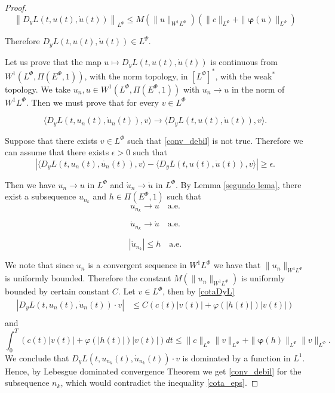 \documentclass[twoside]{article}
\newcommand{\orlnor}{\|_{L^{\Phi}}}
\newcommand{\lphi}{L^{\Phi}}
\newcommand{\lpsi}{L^{\Psi}}
\newcommand{\ephi}{E^{\Phi}}
\newcommand{\wphi}{W^{1}\lphi}
\begin{document}
\begin{proof}
\begin{equation}\label{DyLpsi}
   \left\|D_yL(t,u(t),\dot{u}(t))\right\|_{L^{\Psi}}\leq  M(\|u\|_{\wphi} )\left(\|c\|_{L^{\Psi}}+\|\boldsymbol{\varphi}(u)\|_{L^{\Psi}} \right)
\end{equation}

Therefore $D_yL(t,u(t),\dot{u}(t))\in L^{\Psi}$.

Let us prove that the map   $u\mapsto D_yL(t,u(t),\dot{u}(t))$ is continuous from $W^{1}(\lphi,\Pi(\ephi,1))$, with the norm topology, in $\left[\lphi\right]^{*}$,
with the weak$^*$ topology. We take $u_n,u\in W^{1}(\lphi,\Pi(\ephi,1))$ with $u_n\to u$ in the norm of $\wphi$. Then we must prove that for every $v\in\lphi$

\begin{equation}\label{conv_debil} \langle D_yL(t,u_n(t),\dot{u}_n(t)), v \rangle \to \langle D_yL(t,u(t),\dot{u}(t)), v \rangle. \end{equation}

Suppose that there exists $v\in\lphi$ such that  \eqref{conv_debil} is not true. Therefore we can assume that there exists $\epsilon>0$ such that
\begin{equation}\label{cota_eps}
 \left| \langle D_yL(t,u_n(t),\dot{u_n}(t)), v \rangle - \langle D_yL(t,u(t),\dot{u}(t)), v \rangle\right|\geq \epsilon.
\end{equation}


Then we have $u_n\rightarrow u$ in $\lphi$ and
$\dot{u}_n\rightarrow \dot{u}$ in $\lphi$. By Lemma \ref{segundo lema}, there exist a subsequence $u_{n_k}$ and $h\in \Pi(\ephi,1)$ such that
\[u_{n_k}\rightarrow u \quad\text{a.e.}\]

\[\dot{u}_{n_k}\rightarrow \dot{u} \quad\text{a.e.}\]

\[|\dot{u}_{n_k}|\leq h\quad\text{a.e.}\]

We note that since $u_n$ is a convergent sequence in $\wphi$ we have that $\|u_n\|_{\wphi}$ is uniformly bounded.
Therefore the constant $M(\|u_n\|_{\wphi} )$ is uniformly bounded by certain constant $C$. Let $v\in\lphi$,  then by \eqref{cotaDyL}
\[
  \begin{split}
  \left|D_yL(t,u_n(t),\dot{u}_n(t))\cdot v\right| &\leq C\left(c(t)|v(t)|+\varphi(|h(t)|)|v(t)|\right)\\
  \end{split}
\]
and
\[\int_0^T\left(c(t)|v(t)|+\varphi(|h(t)|)|v(t)|\right)dt\leq \|c\|_{\lpsi} \|v\orlnor+\|\boldsymbol{\varphi}(h)\|_{\lpsi} \|v\orlnor. \]
We conclude that $D_yL(t,u_{n_k}(t),\dot{u}_{n_k}(t))\cdot v$ is dominated by a function in $L^1$. Hence, by Lebesgue dominated convergence Theorem we get
\eqref{conv_debil} for the subsequence $n_k$, which would contradict the inequality \eqref{cota_eps}.


\end{proof}
\end{document}
